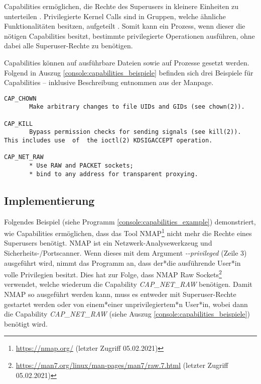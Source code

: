 Capabilities ermöglichen, die Rechte des Superusers in kleinere Einheiten zu
unterteilen \cite{LinuxCapabilitesmakingthemwork}. Privilegierte Kernel Calls
sind in Gruppen, welche ähnliche Funktionalitäten besitzen, aufgeteilt
\cite{man_capabilities}. Somit kann ein Prozess, wenn dieser die nötigen
Capabilities besitzt, bestimmte privilegierte Operationen ausführen, ohne dabei
alle Superuser-Rechte zu benötigen.

Capabilities können auf ausführbare Dateien sowie auf Prozesse gesetzt werden.
Folgend in Auszug \ref{console:capabilities_beispiele} befinden sich drei
Beispiele für Capabilities – inklusive Beschreibung entnommen aus der Manpage.

\clearpage

\renewcommand{\lstlistingname}{Auszug}
\begin{lstlisting}[numbers=none,label={console:capabilities_beispiele},caption={Capabilities Manpage\cite{man_capabilities}}]
CAP_CHOWN
       Make arbitrary changes to file UIDs and GIDs (see chown(2)).

CAP_KILL
       Bypass permission checks for sending signals (see kill(2)).  This includes use  of  the ioctl(2) KDSIGACCEPT operation.

CAP_NET_RAW
       * Use RAW and PACKET sockets;
       * bind to any address for transparent proxying.
\end{lstlisting}

\renewcommand{\lstlistingname}{Programm}

\subsection{Implementierung}
Folgendes Beispiel (siehe Programm \ref{console:capabilities_example})
demonstriert, wie Capabilities ermöglichen, dass das Tool
NMAP\footnote{\url{https://nmap.org/} (letzter Zugriff 05.02.2021)} 
nicht mehr die Rechte eines Superusers benötigt.  NMAP
ist ein Netzwerk-Analysewerkzeug und Sicherheits-/Portscanner. Wenn dieses mit
dem Argument \emph{-{}-privileged} (Zeile 3) ausgeführt wird, nimmt das
Programm an, dass der*die ausführende User*in volle Privilegien besitzt.
Dies hat zur Folge, dass NMAP Raw
Sockets\footnote{\url{https://man7.org/linux/man-pages/man7/raw.7.html}
(letzter Zugriff 05.02.2021)} verwendet, welche wiederum die Capability
\emph{CAP\_NET\_RAW} benötigen. Damit NMAP so ausgeführt werden kann, muss es
entweder mit Superuser-Rechte gestartet werden oder von einem*einer unprivilegiertem*n User*in,
wobei dann die Capability \emph{CAP\_NET\_RAW} (siehe Auszug
\ref{console:capabilities_beispiele}) benötigt wird.

